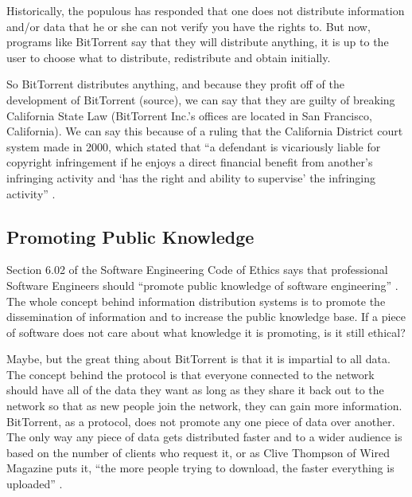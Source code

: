 \documentclass[11pt]{article}
\begin{document}
Historically, the populous has responded that one does not distribute information and/or data that he or she can not verify you have the rights to. But now, programs like BitTorrent say that they will distribute anything, it is up to the user to choose what to distribute, redistribute and obtain initially.

So BitTorrent distributes anything, and because they profit off of the development of BitTorrent (source), we can say that they are guilty of breaking California State Law (BitTorrent Inc.'s offices are located in San Francisco, California). We can say this because of a ruling that the California District court system made in 2000, which stated that ``a defendant is vicariously liable for copyright infringement if he enjoys a direct financial benefit from another's infringing activity and `has the right and ability to supervise' the infringing activity'' \cite{2000m}.

\subsection{Promoting Public Knowledge}

Section 6.02 of the Software Engineering Code of Ethics says that professional Software Engineers should ``promote public knowledge of software engineering'' \cite[6.02]{secode}. The whole concept behind information distribution systems is to promote the dissemination of information and to increase the public knowledge base. If a piece of software does not care about what knowledge it is promoting, is it still ethical?

Maybe, but the great thing about BitTorrent is that it is impartial to all data. The concept behind the protocol is that everyone connected to the network should have all of the data they want as long as they share it back out to the network so that as new people join the network, they can gain more information. BitTorrent, as a protocol, does not promote any one piece of data over another. The only way any piece of data gets distributed faster and to a wider audience is based on the number of clients who request it, or as Clive Thompson of Wired Magazine puts it, ``the more people trying to download, the faster everything is uploaded'' \cite{wiredbt}.
\end{document}
